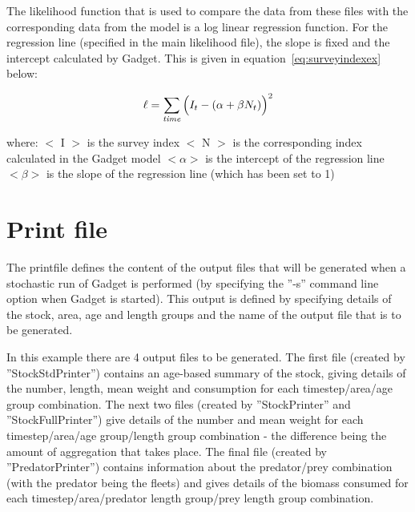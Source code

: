 \documentclass[10pt,titlepage]{article}
\begin{document}
\bigskip
The likelihood function that is used to compare the data from these files with the corresponding data from the model is a log linear regression function.  For the regression line (specified in the main likelihood file), the slope is fixed and the intercept calculated by Gadget.  This is given in equation~\ref{eq:surveyindexex} below:

\begin{equation}\label{eq:surveyindexex}
\ell = \sum_{\it time}\Big(I_{t} - (\alpha + \beta N_{t})\Big)^2
\end{equation}

where:\newline
$<$ I $>$ is the survey index\newline
$<$ N $>$ is the corresponding index calculated in the Gadget model\newline
$<\alpha>$ is the intercept of the regression line\newline
$<\beta>$ is the slope of the regression line (which has been set to 1)

{\small }

\section{Print file}

The printfile defines the content of the output files that will be generated when a stochastic run of Gadget is performed (by specifying the ''-s'' command line option when Gadget is started).  This output is defined by specifying details of the stock, area, age and length groups and the name of the output file that is to be generated.

\bigskip
In this example there are 4 output files to be generated.  The first file (created by ''StockStdPrinter'') contains an age-based summary of the stock, giving details of the number, length, mean weight and consumption for each timestep/area/age group combination.  The next two files (created by ''StockPrinter'' and ''StockFullPrinter'') give details of the number and mean weight for each timestep/area/age group/length group combination - the difference being the amount of aggregation that takes place.  The final file (created by ''PredatorPrinter'') contains information about the predator/prey combination (with the predator being the fleets) and gives details of the biomass consumed for each timestep/area/predator length group/prey length group combination.

{\small }
\end{document}
